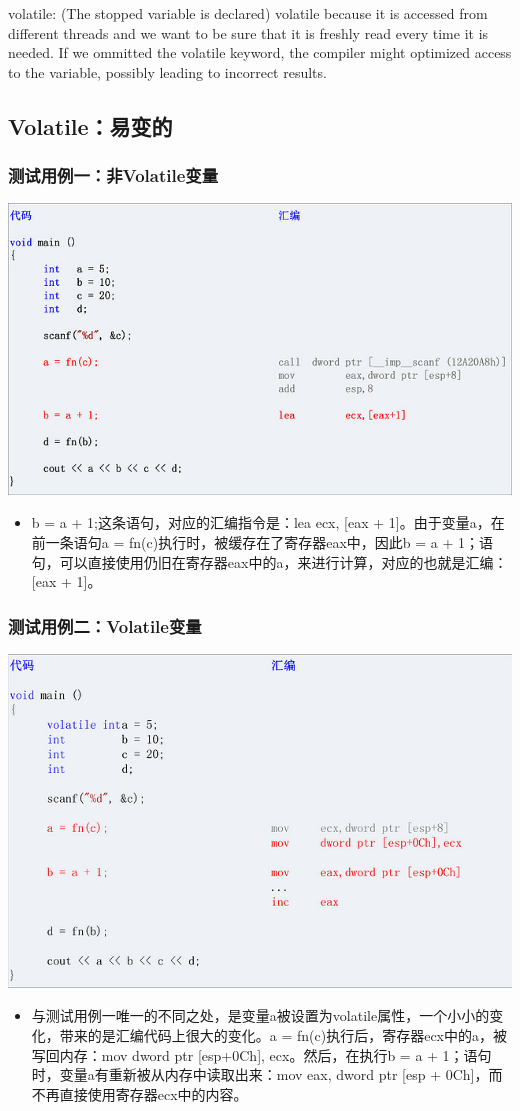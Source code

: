 \documentclass[9pt,b5paper]{article}
\begin{document}
volatile: (The stopped variable is declared) volatile because it is accessed from different threads and we want to be sure that it is freshly read every time it is needed. If we ommitted the volatile keyword, the compiler might optimized access to the variable, possibly leading to incorrect results. 
\subsection{Volatile：易变的}
\label{sec-9-1}
\subsubsection{测试用例一：非Volatile变量}
\label{sec-9-1-1}
\includegraphics[width=.9\linewidth]{../pic/v1.jpg}
\begin{itemize}
\item b = a + 1;这条语句，对应的汇编指令是：lea ecx, [eax + 1]。由于变量a，在前一条语句a = fn(c)执行时，被缓存在了寄存器eax中，因此b = a + 1；语句，可以直接使用仍旧在寄存器eax中的a，来进行计算，对应的也就是汇编：[eax + 1]。
\end{itemize}
\subsubsection{测试用例二：Volatile变量}
\label{sec-9-1-2}
\includegraphics[width=.9\linewidth]{../pic/v2.jpg}
\begin{itemize}
\item 与测试用例一唯一的不同之处，是变量a被设置为volatile属性，一个小小的变化，带来的是汇编代码上很大的变化。a = fn(c)执行后，寄存器ecx中的a，被写回内存：mov dword ptr [esp+0Ch], ecx。然后，在执行b = a + 1；语句时，变量a有重新被从内存中读取出来：mov eax, dword ptr [esp + 0Ch]，而不再直接使用寄存器ecx中的内容。
\end{itemize}
\end{document}
